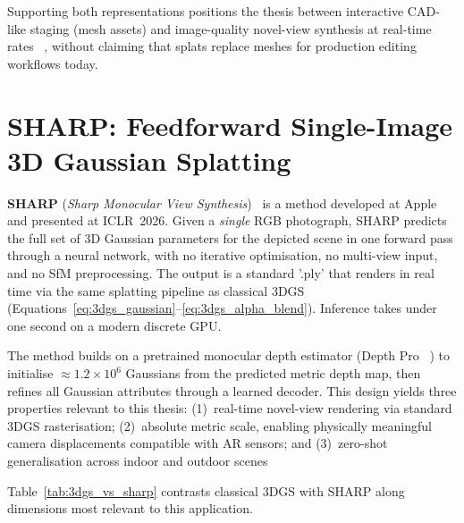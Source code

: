 {Supporting both representations positions the thesis between interactive
CAD-like staging (mesh assets) and image-quality novel-view synthesis at
real-time rates ~\cite{kerbl20233dgs}, without claiming that splats replace meshes for
production editing workflows today.


\section{SHARP: Feedforward Single-Image 3D Gaussian Splatting}
\label{sec:sharp}

\textbf{SHARP} (\emph{Sharp Monocular View Synthesis})~\cite{sharp-monocular-view} is a
method developed at Apple and presented at ICLR~2026. Given a \emph{single} RGB
photograph, SHARP predicts the full set of 3D Gaussian parameters for the depicted
scene in one forward pass through a neural network, with no iterative optimisation, no
multi-view input, and no SfM preprocessing. The output is a standard '.ply' that
renders in real time via the same splatting pipeline as classical 3DGS
(Equations~\ref{eq:3dgs_gaussian}--\ref{eq:3dgs_alpha_blend}). Inference takes under one
second on a modern discrete GPU.

The method builds on a pretrained monocular depth estimator (Depth
Pro  ~\cite{BDGZ25}) to initialise $\approx 1.2\times10^6$ Gaussians from the predicted
metric depth map, then refines all Gaussian attributes through a learned decoder. This
design yields three properties relevant to this thesis: (1)~real-time novel-view
rendering via standard 3DGS rasterisation; (2)~absolute metric scale, enabling
physically meaningful camera displacements compatible with AR sensors; and
(3)~zero-shot generalisation across indoor and outdoor scenes

Table~\ref{tab:3dgs_vs_sharp} contrasts classical 3DGS with SHARP along dimensions
most relevant to this application.

}
